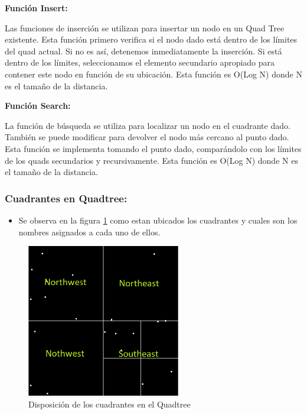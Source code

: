 \documentclass{article}
\begin{document}
\vspace{5mm}
\textbf{Función Insert:}

Las funciones de inserción se utilizan para insertar un nodo en un Quad Tree existente. Esta función primero verifica si el nodo dado está dentro de los límites del quad actual. Si no es así, detenemos inmediatamente la inserción. Si está dentro de los límites, seleccionamos el elemento secundario apropiado para contener este nodo en función de su ubicación. Esta función es O(Log N) donde N es el tamaño de la distancia.

\vspace{5mm}
\textbf{Función Search:}

La función de búsqueda se utiliza para localizar un nodo en el cuadrante dado. También se puede modificar para devolver el nodo más cercano al punto dado. Esta función se implementa tomando el punto dado, comparándolo con los límites de los quads secundarios y recursivamente. Esta función es O(Log N) donde N es el tamaño de la distancia.
\clearpage
\subsubsection{Cuadrantes en Quadtree: }
\begin{itemize}
	\item Se observa en la figura \ref{fig:quadtree_cuadrante} como estan ubicados los cuadrantes y cuales son los nombres asignados a cada uno de ellos.
\end{itemize}

\begin{figure}[h!]
	\centering
	\includegraphics[width=0.6\textwidth]{img/quadtree_cuadrante.png}
	\caption{Disposición de los cuadrantes en el Quadtree}
	\label{fig:quadtree_cuadrante}
\end{figure}
\end{document}
